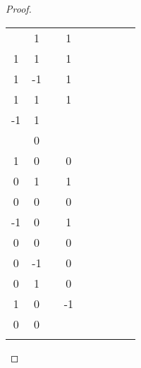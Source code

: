 \begin{proof}
\begin{tabular}{c|c|c|c|c|c|c|c|c}
\begin{matrix}
			-1 & 1
		\end{matrix}\)
		 &
		\( \begin{matrix}
			1 & 1 \\
			1 & 1
		\end{matrix}\)
		 &
		\( \begin{matrix}
			1 & 1  \\
			1 & -1
		\end{matrix}\)
		 &
		\( \begin{matrix}
			-1 & 1 \\
			1  & 1
		\end{matrix}\)
		 &
		\( \begin{matrix}
			1  & 1 \\
			-1 & 1
		\end{matrix}\) \\
		\hline
		\( \begin{matrix}
			1 & 0 \\
			1 & 0
		\end{matrix}\)
		 &
		\( \begin{matrix}
			1 & 0 \\
			0 & 1
		\end{matrix}\)
		 &
		\( \begin{matrix}
			1 & 1 \\
			0 & 0
		\end{matrix}\)
		 &
		\( \begin{matrix}
			1  & 0 \\
			-1 & 0
		\end{matrix}\)
		 &
		\( \begin{matrix}
			1 & 1 \\
			0 & 0
		\end{matrix}\)
		 &
		\( \begin{matrix}
			1 & 0  \\
			0 & -1
		\end{matrix}\)
		 &
		\( \begin{matrix}
			1 & 0 \\
			0 & 1
		\end{matrix}\)
		 &
		\( \begin{matrix}
			1 & 0 \\
			1 & 0
		\end{matrix}\)
		 &
		\( \begin{matrix}
			1 & -1 \\
			0 & 0
		\end{matrix}\) \\
		\hline
		\( \begin{matrix}

\end{matrix}
\end{tabular}
\end{proof}
